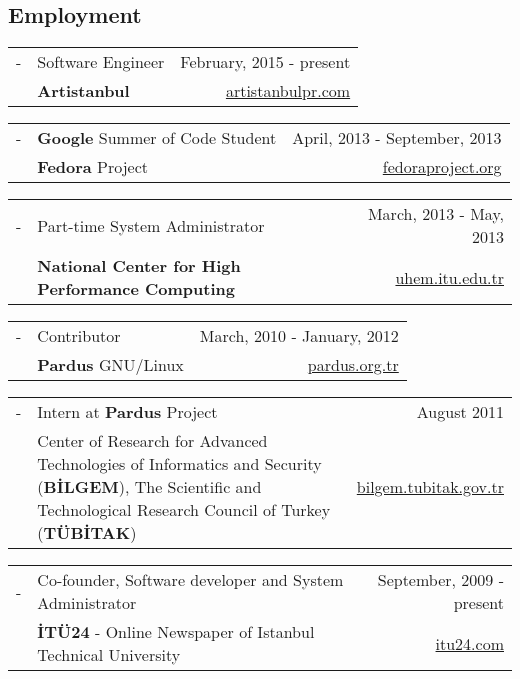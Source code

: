 \documentclass[11pt,a4paper]{article}
\renewenvironment{itemize}{
  \begin{list}{}{
    \setlength{\leftmargin}{0em}
  }
}{
  \end{list}
}
\begin{document}
\subsection*{Employment}
\begin{itemize}
\item
\begin{tabularx}{\textwidth}{l X r}
- & Software Engineer & February, 2015 - present\\
& \textbf{Artistanbul} & \href{http://www.artistanbulpr.com/}{artistanbulpr.com}
\end{tabularx}
\item
\begin{tabularx}{\textwidth}{l X r}
- & \textbf{Google} Summer of Code Student & April, 2013 - September, 2013\\
& \textbf{Fedora} Project & \href{http://fedoraproject.org/}{fedoraproject.org}
\end{tabularx}
\item
\begin{tabularx}{\textwidth}{l X r}
- & Part-time System Administrator & March, 2013 - May, 2013\\
& \textbf{National Center for High Performance Computing} & \href{http://www.uhem.itu.edu.tr/}{uhem.itu.edu.tr}
\end{tabularx}
\item
\begin{tabularx}{\textwidth}{l X r}
- & Contributor & March, 2010 - January, 2012\\
& \textbf{Pardus} GNU/Linux & \href{http://www.pardus.org.tr/}{pardus.org.tr}
\end{tabularx}
\item
\begin{tabularx}{\textwidth}{l X r}
- & Intern at \textbf{Pardus} Project & August 2011\\
& Center of Research for Advanced Technologies of Informatics and Security (\textbf{BİLGEM}), The Scientific and Technological Research Council of Turkey (\textbf{TÜBİTAK}) & \href{http://bilgem.tubitak.gov.tr}{bilgem.tubitak.gov.tr}
\end{tabularx}
\item
\begin{tabularx}{\textwidth}{l X r}
- & Co-founder, Software developer and System Administrator & September, 2009 - present\\
& \textbf{İTÜ24} - Online Newspaper of Istanbul Technical University & \href{http://itu24.com}{itu24.com}
\end{tabularx}
\end{itemize}
\end{document}
